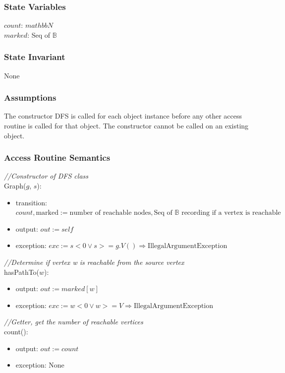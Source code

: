 \documentclass[12pt]{article}
\begin{document}
\subsubsection* {State Variables}

$count$: $mathbb{N}$\\
$marked$: Seq of $\mathbb{B}$

\subsubsection* {State Invariant}

None
\subsubsection* {Assumptions}

The constructor DFS is called for each object instance before any other access routine is called for that object.  The constructor cannot be called on
an existing object.

\subsubsection* {Access Routine Semantics}

\noindent \textit{//Constructor of DFS class}\\
Graph($g$, $s$):
\begin{itemize}
\item transition: $count, \mbox{marked} := \mbox{number of reachable nodes}, \mbox{Seq of }\mathbb{B}\mbox{ recording if a vertex is reachable}$
\item output: $out := \mathit{self}$
\item exception: $exc := s < 0 \lor s >= g.V() \Rightarrow \mbox{IllegalArgumentException}$
\end{itemize}

\noindent \textit{//Determine if vertex w is reachable from the source vertex}\\
\noindent hasPathTo($w$):
\begin{itemize}
\item output: $out := marked[w]$
\item exception: $exc := w < 0 \lor w >= V \Rightarrow \mbox{IllegalArgumentException}$
\end{itemize}

\noindent \textit{//Getter, get the number of reachable vertices}\\
\noindent count():
\begin{itemize}
\item output: $out := count$
\item exception: None
\end{itemize}
\newpage
\end{document}

